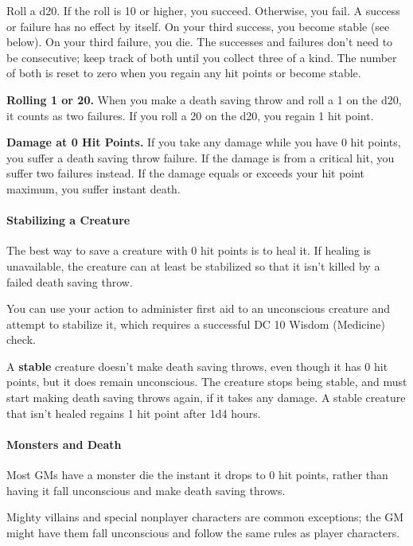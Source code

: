 \documentclass[
]{article}
\begin{document}
Roll a d20. If the roll is 10 or higher, you succeed. Otherwise, you
fail. A success or failure has no effect by itself. On your third
success, you become stable (see below). On your third failure, you die.
The successes and failures don't need to be consecutive; keep track of
both until you collect three of a kind. The number of both is reset to
zero when you regain any hit points or become stable.

\textbf{Rolling 1 or 20.} When you make a death saving throw and roll a
1 on the d20, it counts as two failures. If you roll a 20 on the d20,
you regain 1 hit point.

\textbf{Damage at 0 Hit Points.} If you take any damage while you have 0
hit points, you suffer a death saving throw failure. If the damage is
from a critical hit, you suffer two failures instead. If the damage
equals or exceeds your hit point maximum, you suffer instant death.

\hypertarget{stabilizing-a-creature}{%
\paragraph{Stabilizing a Creature}\label{stabilizing-a-creature}}

The best way to save a creature with 0 hit points is to heal it. If
healing is unavailable, the creature can at least be stabilized so that
it isn't killed by a failed death saving throw.

You can use your action to administer first aid to an unconscious
creature and attempt to stabilize it, which requires a successful DC 10
Wisdom (Medicine) check.

A \textbf{stable} creature doesn't make death saving throws, even though
it has 0 hit points, but it does remain unconscious. The creature stops
being stable, and must start making death saving throws again, if it
takes any damage. A stable creature that isn't healed regains 1 hit
point after 1d4 hours.

\hypertarget{monsters-and-death}{%
\paragraph{Monsters and Death}\label{monsters-and-death}}

Most GMs have a monster die the instant it drops to 0 hit points, rather
than having it fall unconscious and make death saving throws.

Mighty villains and special nonplayer characters are common exceptions;
the GM might have them fall unconscious and follow the same rules as
player characters.
\end{document}
